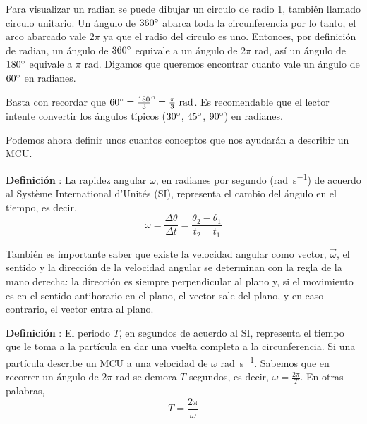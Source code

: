 \documentclass[letterpaper]{article}
\newcounter{definiciones}
\newcommand{\defii}{\stepcounter{definiciones} \textbf{Definición \thedefiniciones}: }
\newenvironment{defi}{\begin{framed} \defii}{\end{framed}}
\begin{document}
Para visualizar un radian se puede dibujar un circulo de radio 1, también llamado circulo unitario. Un ángulo de $360\degree$ abarca toda la circunferencia por lo tanto, el arco abarcado vale $2\pi$ ya que el radio del circulo es uno. Entonces, por definición de radian, un ángulo de $360\degree$ equivale a un ángulo de $2\pi$ \si{rad}, así un ángulo de $180\degree$ equivale a $\pi$ \si{rad}. Digamos que queremos encontrar cuanto vale un ángulo de $60\degree$ en radianes.  
\begin{figure}[h]
\centering
{}
\end{figure}

Basta con recordar que $60\degree = \frac{180}{3}\degree = \frac{\pi}{3}\ \si{rad}$. Es recomendable que el lector intente convertir los ángulos típicos ($30\degree$, $45\degree$, $90\degree$) en radianes.

\pagebreak

Podemos ahora definir unos cuantos conceptos que nos ayudarán a describir un MCU.

\begin{defi}
 La rapidez angular $\omega$, en radianes por segundo (\si{rad.s^{-1}}) de acuerdo al Système International d'Unités (SI), representa el cambio del ángulo en el tiempo, es decir, $$ \omega = \frac{\Delta \theta}{\Delta t} = \frac{\theta_2 - \theta_1}{t_2 - t_1} $$ 

 También es importante saber que existe la velocidad angular como vector, $\vec{\omega}$, el sentido y la dirección de la velocidad angular se determinan con la regla de la mano derecha: la dirección es siempre perpendicular al plano y, si el movimiento es en el sentido antihorario en el plano, el vector sale del plano, y en caso contrario, el vector entra al plano.
\end{defi} 

\begin{defi}
 El periodo $T$, en segundos de acuerdo al SI, representa el tiempo que le toma a la partícula en dar una vuelta completa a la circunferencia. Si una partícula describe un MCU a una velocidad de $\omega$ \si{rad.s^{-1}}. Sabemos que en recorrer un ángulo de $2\pi$ \si{rad} se demora $T$ segundos, es decir, $\omega = \frac{2\pi}{T}$. En otras palabras, $$T = \frac{2\pi}{\omega}$$
\end{defi}  
\end{document}

